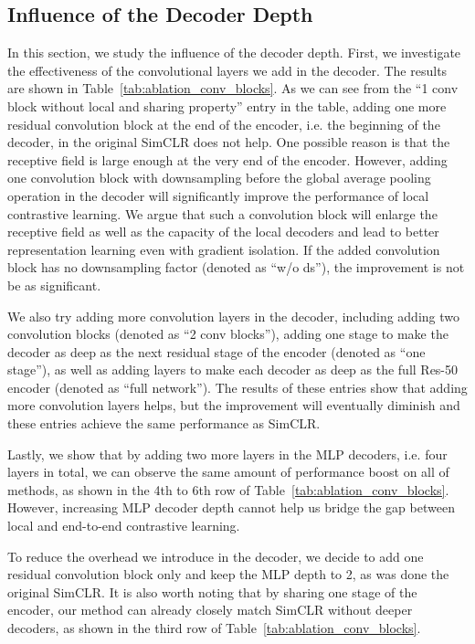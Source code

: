\subsection{Influence of the Decoder Depth}
In this section, we study the influence of the decoder depth. First, we investigate the
effectiveness of the convolutional layers we add in the decoder. The results are shown in
Table~\ref{tab:ablation_conv_blocks}. As we can see from the ``1 conv block without local and
sharing property'' entry in the table, adding one more residual convolution block at the end of the
encoder, i.e. the beginning of the decoder, in the original SimCLR does not help. One possible
reason is that the receptive field is large enough at the very end of the encoder. However, adding
one convolution block with downsampling before the global average pooling operation in the decoder
will significantly improve the performance of local contrastive learning. We argue that such a
convolution block will enlarge the receptive field as well as the capacity of the local decoders and
lead to better representation learning even with gradient isolation. If the added convolution block
has no downsampling factor (denoted as ``w/o ds''), the improvement is not be as significant.
 
We also try adding more convolution layers in the decoder, including adding two convolution
blocks (denoted as ``2 conv blocks''), adding one stage to make the decoder as deep as the
next residual stage of the encoder (denoted as ``one stage''), as well as adding layers to make each
decoder as deep as the full Res-50 encoder (denoted as ``full network''). The results of these
entries show that adding more convolution layers helps, but the improvement will eventually diminish
and these entries achieve the same performance as SimCLR.

Lastly, we show that by adding two more layers in the MLP decoders, i.e. four layers in total, we
can observe the same amount of performance boost on all of methods, as shown in the 4th to 6th row
of Table~\ref{tab:ablation_conv_blocks}. However, increasing MLP decoder depth cannot help us bridge
the gap between local and end-to-end contrastive learning.

To reduce the overhead we introduce in the decoder, we decide to add one residual convolution block
only and keep the MLP depth to 2, as was done the original SimCLR. It is also worth noting that by
sharing one stage of the encoder, our method can already closely match SimCLR without deeper
decoders, as shown in the third row of Table~\ref{tab:ablation_conv_blocks}.

